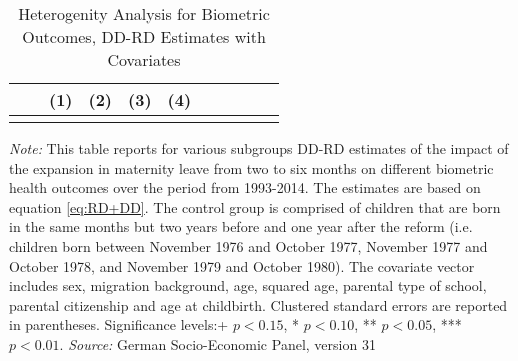 \documentclass[a4paper ]{article}
\newlength\FHoffset
\begin{document}
\newpage



\begin{table}[p] \centering
\def\sym#1{\ifmmode^{#1}\else\(^{#1}\)\fi}
\caption{Heterogenity Analysis for Biometric Outcomes, DD-RD Estimates with Covariates}\label{tab:Heterog_BMCV}
\begin{tabular}{l*{10}{c}}
\toprule
&  &\multicolumn{1}{c}{(1)}&\multicolumn{1}{c}{(2)}&\multicolumn{1}{c}{(3)}&\multicolumn{1}{c}{(4)} \\ 
\midrule\\
	 
 \bottomrule
\end{tabular}
\begin{minipage}{\textwidth} %
{\footnotesize \textit{Note:} This table reports for various subgroups DD-RD estimates of the impact of the expansion in maternity leave from two to six months on different biometric health outcomes over the period from 1993-2014. The estimates are based on equation \ref{eq:RD+DD}. The control group is comprised of children that are born in the same months but two years before and one year after the reform (i.e. children born between November 1976 and October 1977, November 1977 and October 1978, and November 1979 and October 1980). The covariate vector includes sex, migration background, age, squared age, parental type of school, parental citizenship and age at childbirth.\newline
Clustered standard errors are reported in parentheses. Significance levels:+ \(p<0.15\), * \(p<0.10\), ** \(p<0.05\), *** \(p<0.01\). \newline \textit{Source: }German Socio-Economic Panel, version 31\par}
\end{minipage}
\end{table}


	

	
		\setlength\FHoffset{-2.5cm} 
\fancyheadoffset{\FHoffset}
\end{document}
